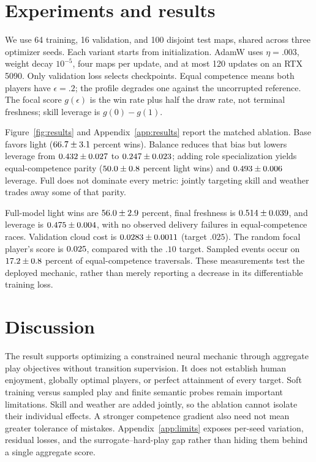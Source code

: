 \documentclass{article}
\begin{document}
\section{Experiments and results}

We use 64 training, 16 validation, and 100 disjoint test maps, shared across three
optimizer seeds. Each variant starts from initialization. AdamW uses
$\eta=.003$, weight decay $10^{-5}$, four maps per update, and at most 120
updates on an RTX 5090. Only validation loss selects checkpoints. Equal
competence means both players have $\epsilon=.2$; the profile degrades one
against the uncorrupted reference. The focal score $g(\epsilon)$ is the win
rate plus half the draw rate, not terminal freshness; skill leverage is
$g(0)-g(1)$.

Figure~\ref{fig:results} and Appendix~\ref{app:results} report the matched
ablation. Base favors light ($66.7\pm3.1$ percent wins). Balance reduces
that bias but lowers leverage from $0.432\pm0.027$ to $0.247\pm0.023$;
adding role specialization yields equal-competence parity
($50.0\pm0.8$ percent light wins) and $0.493\pm0.006$ leverage. Full does
not dominate every metric: jointly targeting skill and weather trades away
some of that parity.

Full-model light wins are $56.0\pm2.9$ percent, final freshness is
$0.514\pm0.039$, and leverage is $0.475\pm0.004$, with no observed delivery
failures in equal-competence races. Validation cloud cost is $0.0283\pm0.0011$
(target $.025$).
The random focal player's score is $0.025$, compared with the $.10$
target. Sampled events occur on $17.2\pm0.8$ percent of equal-competence
traversals. These measurements test the deployed mechanic, rather than merely
reporting a decrease in its differentiable training loss.

\section{Discussion}

The result supports optimizing a constrained neural mechanic through aggregate
play objectives without transition supervision. It does not establish human
enjoyment, globally optimal players, or perfect attainment of every target.
Soft training versus sampled play and finite semantic probes remain important
limitations. Skill and weather are added jointly, so the ablation cannot isolate
their individual effects. A stronger competence gradient also need not mean
greater tolerance of mistakes. Appendix~\ref{app:limits} exposes per-seed
variation, residual losses, and the surrogate--hard-play gap rather than hiding
them behind a single aggregate score.
\end{document}
